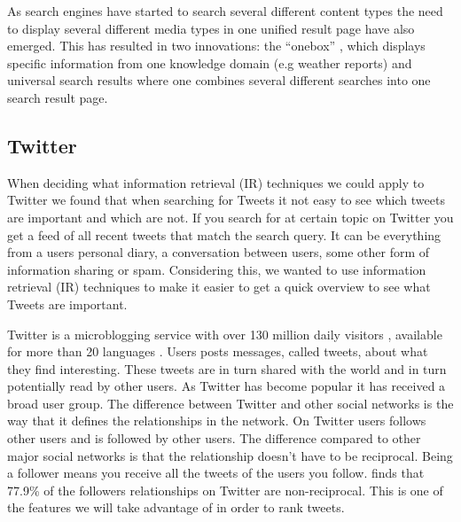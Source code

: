 As search engines have started to search several different content types the need to display several different media types in one unified result page have also emerged. This has resulted in two innovations: the “onebox” \citep{Baeza-Yates2011}, which displays specific information from one knowledge domain (e.g weather reports) and universal search results where one combines several different searches into one search result page.

\subsection{Twitter}
\label{Twitter}
When deciding what information retrieval (IR) techniques we could apply to Twitter we found that when searching for Tweets it not easy to see which tweets are important and which are not. If you search for at certain topic on Twitter you get a feed of all recent tweets that match the search query. It can be everything from a users personal diary, a conversation between users, some other form of information sharing or spam. Considering this, we wanted to use information retrieval (IR) techniques to make it easier to get a quick overview to see what Tweets are important. 

Twitter is a microblogging service with over 130 million daily visitors \citep{WolframAlpha}, available for more than 20 languages \citep{Twitter2012}. Users posts messages, called tweets, about what they find interesting. These tweets are in turn shared with the world and in turn potentially read by other users. As Twitter has become popular it has received a broad user group. The difference between Twitter and other social networks is the way that it defines the relationships in the network. On Twitter users follows other users and is followed by other users. The difference compared to other major social networks is that the relationship doesn't have to be reciprocal. Being a follower means you receive all the tweets of the users you follow. \citet{Kwak2010} finds that 77.9\% of the followers relationships on Twitter are non-reciprocal. This is one of the features we will take advantage of in order to rank tweets. 


